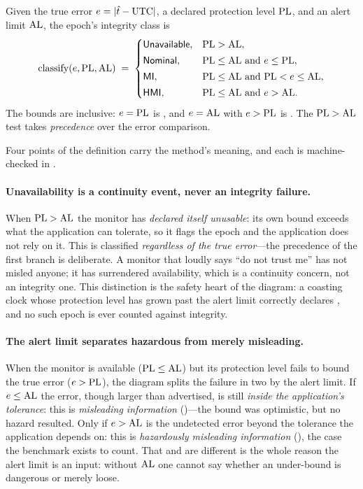 \begin{definition}
\label{def:classify}
Given the true error $e=|\hat t-\mathrm{UTC}|$, a declared protection level $\mathrm{PL}$, and an
alert limit $\mathrm{AL}$, the epoch's integrity class is
\begin{equation}
  \operatorname{classify}(e,\mathrm{PL},\mathrm{AL}) \;=\;
  \begin{cases}
    \textsf{Unavailable}{}, & \mathrm{PL} > \mathrm{AL},\\[2pt]
    \textsf{Nominal}{}, & \mathrm{PL} \le \mathrm{AL} \ \text{and}\ e \le \mathrm{PL},\\[2pt]
    \textsf{MI}{}, & \mathrm{PL} \le \mathrm{AL} \ \text{and}\ \mathrm{PL} < e \le \mathrm{AL},\\[2pt]
    \textsf{HMI}{}, & \mathrm{PL} \le \mathrm{AL} \ \text{and}\ e > \mathrm{AL}.
  \end{cases}
  \label{eq:classify}
\end{equation}
The bounds are inclusive: $e=\mathrm{PL}$ is \Nominal{}, and $e=\mathrm{AL}$ with $e>\mathrm{PL}$ is
\MI{}. The $\mathrm{PL}>\mathrm{AL}$ test takes \emph{precedence} over the error comparison.
\end{definition}

Four points of the definition carry the method's meaning, and each is
machine-checked in .

\paragraph{Unavailability is a continuity event, never an integrity failure.}
When $\mathrm{PL}>\mathrm{AL}$ the monitor has \emph{declared itself unusable}: its own bound
exceeds what the application can tolerate, so it flags the epoch and the
application does not rely on it. This is classified \Unavail{} \emph{regardless of
the true error}---the precedence of the first branch is deliberate. A monitor that
loudly says ``do not trust me'' has not misled anyone; it has surrendered
availability, which is a continuity concern, not an integrity one. This distinction
is the safety heart of the diagram: a coasting clock whose protection level has
grown past the alert limit correctly declares \Unavail{}, and no such epoch is ever
counted against integrity.

\paragraph{The alert limit separates hazardous from merely misleading.}
When the monitor is available ($\mathrm{PL}\le\mathrm{AL}$) but its protection level fails to bound
the true error ($e>\mathrm{PL}$), the diagram splits the failure in two by the alert limit.
If $e\le\mathrm{AL}$ the error, though larger than advertised, is still \emph{inside the
application's tolerance}: this is \emph{misleading information} (\MI{})---the bound
was optimistic, but no hazard resulted. Only if $e>\mathrm{AL}$ is the undetected error
beyond the tolerance the application depends on: this is \emph{hazardously
misleading information} (\HMI{}), the case the benchmark exists to count. That
\MI{} and \HMI{} are different is the whole reason the alert limit is an input:
without $\mathrm{AL}$ one cannot say whether an under-bound is dangerous or merely loose.

